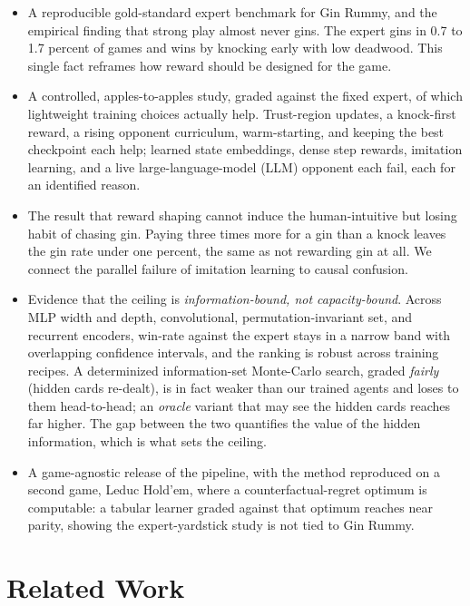 \documentclass[letterpaper]{article} %
\begin{document}
\begin{itemize}
\itemsep0.15em
\item A reproducible gold-standard expert benchmark for Gin Rummy, and the
empirical finding that strong play almost never gins. The expert gins in 0.7 to
1.7 percent of games and wins by knocking early with low deadwood. This single
fact reframes how reward should be designed for the game.
\item A controlled, apples-to-apples study, graded against the fixed expert, of
which lightweight training choices actually help. Trust-region updates, a
knock-first reward, a rising opponent curriculum, warm-starting, and keeping the
best checkpoint each help; learned state embeddings, dense step rewards,
imitation learning, and a live large-language-model (LLM) opponent each fail,
each for an identified reason.
\item The result that reward shaping cannot induce the human-intuitive but
losing habit of chasing gin. Paying three times more for a gin than a knock
leaves the gin rate under one percent, the same as not rewarding gin at all. We
connect the parallel failure of imitation learning to causal confusion.
\item Evidence that the ceiling is \emph{information-bound, not capacity-bound}.
Across MLP width and depth, convolutional, permutation-invariant set,
and recurrent encoders, win-rate against the expert stays in a narrow band with
overlapping confidence intervals, and the ranking is robust across training
recipes. A determinized information-set Monte-Carlo search, graded \emph{fairly}
(hidden cards re-dealt), is in fact weaker than our trained agents and loses to
them head-to-head; an \emph{oracle} variant that may see the hidden cards reaches
far higher. The gap between the two quantifies the value of the hidden
information, which is what sets the ceiling.
\item A game-agnostic release of the pipeline, with the method reproduced on a
second game, Leduc Hold'em, where a counterfactual-regret optimum is computable:
a tabular learner graded against that optimum reaches near parity, showing the
expert-yardstick study is not tied to Gin Rummy.
\end{itemize}

\section{Related Work}
\end{document}
